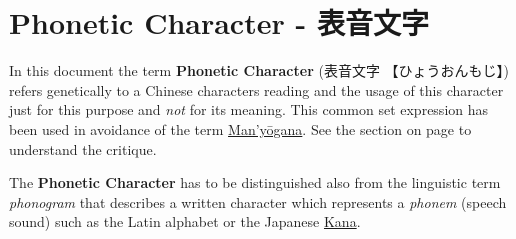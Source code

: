 \section{Phonetic Character - 表音文字} \label{sec:PhoneticCharacter}

In this document the term \textbf{Phonetic Character} ({表音文字}
{【ひょうおんもじ】}) refers genetically to a Chinese characters reading and
the usage of this character just for this purpose and \textit{not} for its
meaning. This common set expression has been used in avoidance of the term
\hyperref[sec:Manyogana]{Man'yōgana}. See the section 
on page \pageref{sec:Manyogana} to understand the critique.

The \textbf{Phonetic Character} has to be distinguished also from the
linguistic term \textit{phonogram} that describes a written character which
represents a \textit{phonem} (speech sound) such as the Latin alphabet or the
Japanese \hyperref[sec:Kana]{Kana}. 

